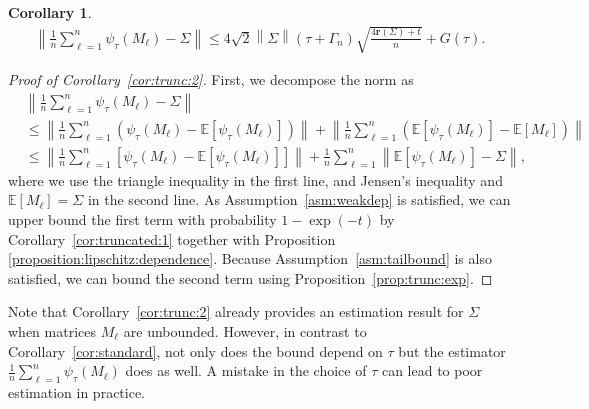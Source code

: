 \documentclass[11pt,a4paper]{article}
\newtheorem{corollary}[theorem]{Corollary}
\theoremstyle{remark}
\theoremstyle{definition}
\theoremstyle{definition}
\begin{document}
\begin{bibunit}[apalike]
\begin{corollary}
\begin{align*}
    \left\|\frac{1}{n}\sum_{\ell=1}^{n} \psi_\tau(M_{\ell})-\Sigma\right\|\le{4}\sqrt{2}\left\|\Sigma\right\|\left({\tau+\Gamma_{n}}\right)\sqrt{\frac{4\mathbf{r}\left(\Sigma\right)+t}{n}} + G(\tau).
\end{align*}
\end{corollary}
\begin{proof}[Proof of Corollary~\ref{cor:trunc:2}]
First, we decompose the norm as
\begin{align*}
 &\left\|\frac{1}{n}\sum_{\ell=1}^{n} \psi_\tau(M_{\ell})-\Sigma\right\|\\
 & \leq  \left\|\frac{1}{n}\sum_{\ell=1}^{n} (\psi_\tau(M_{\ell})- \mathbb{E}[\psi_\tau(M_{\ell})] )\right\| +  \left\|\frac{1}{n}\sum_{\ell=1}^{n} (\mathbb{E}[\psi_\tau(M_{\ell})] - \mathbb{E}[M_{\ell} ])\right\|
 \\
 & \leq  \left\|\frac{1}{n}\sum_{\ell=1}^{n} [\psi_\tau(M_{\ell})- \mathbb{E}[\psi_\tau(M_{\ell})] ]\right\| + \frac{1}{n}\sum_{\ell=1}^{n} \left\| \mathbb{E}[\psi_\tau(M_{\ell})] - \Sigma \right\|,
\end{align*}
where we use the triangle inequality in the first line, and Jensen's inequality and $\mathbb{E}[M_{\ell} ]=\Sigma$ in the second line. As Assumption~\ref{asm:weakdep} is satisfied, we can upper bound the first term with probability $1-\exp(-t)$ by Corollary~\ref{cor:truncated:1} together with Proposition \ref{proposition:lipschitz:dependence}. Because Assumption~\ref{asm:tailbound} is also satisfied, we can bound the second term using Proposition~\ref{prop:trunc:exp}. 
\end{proof}

Note that Corollary~\ref{cor:trunc:2} already provides an estimation result for $\Sigma$ when matrices $M_\ell$ are unbounded. However, in contrast to Corollary~\ref{cor:standard}, not only does the bound depend on $\tau$ but the estimator $\frac{1}{n}\sum_{\ell=1}^{n} \psi_\tau(M_{\ell})$ does as well. A mistake in the choice of $\tau$ can lead to poor estimation in practice.


\end{bibunit}
\end{document}
